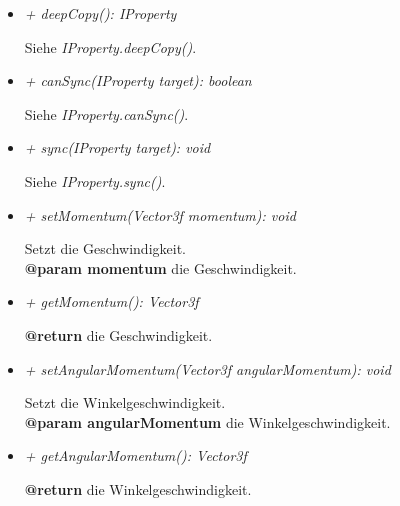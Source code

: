             \begin{itemize}
                \item \textit{+ deepCopy(): IProperty}
                    \begin{leftbar}[0.9\linewidth]
                        Siehe \textit{IProperty.deepCopy()}.
                    \end{leftbar}
                \item \textit{+ canSync(IProperty target): boolean}
                    \begin{leftbar}[0.9\linewidth]
                        Siehe \textit{IProperty.canSync()}.
                    \end{leftbar}
                \item \textit{+ sync(IProperty target): void}
                    \begin{leftbar}[0.9\linewidth]
                        Siehe \textit{IProperty.sync()}.
                    \end{leftbar}
                \item \textit{+ setMomentum(Vector3f momentum): void}
                    \begin{leftbar}[0.9\linewidth]
                        Setzt die Geschwindigkeit.\\
                        \textbf{@param momentum} die Geschwindigkeit.
                    \end{leftbar}
                \item \textit{+ getMomentum(): Vector3f}
                    \begin{leftbar}[0.9\linewidth]
                        \textbf{@return} die Geschwindigkeit.
                    \end{leftbar}
                \item \textit{+ setAngularMomentum(Vector3f angularMomentum): void}
                    \begin{leftbar}[0.9\linewidth]
                        Setzt die Winkelgeschwindigkeit.\\
                        \textbf{@param angularMomentum} die Winkelgeschwindigkeit.
                    \end{leftbar}
                \item \textit{+ getAngularMomentum(): Vector3f}
                    \begin{leftbar}[0.9\linewidth]
                        \textbf{@return} die Winkelgeschwindigkeit.
                    \end{leftbar}
            \end{itemize}

